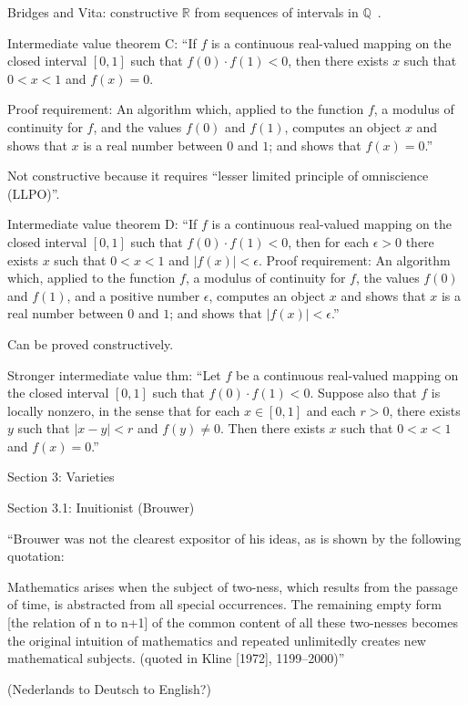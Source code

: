 Bridges and Vita: constructive $\mathbb{R}$ from sequences
of intervals in $\mathbb{Q}$~\cite{Bridger:2019}.

Intermediate value theorem C: 
``If $f$ is a continuous real-valued mapping 
on the closed interval $[0,1]$ such that $f(0)⋅f(1)<0$, 
then there exists $x$ such that $0<x<1$ and $f(x)=0$.

Proof requirement: 
An algorithm which, applied to the function $f$, 
a modulus of continuity for $f$, and the values $f(0)$ and $f(1)$,
computes an object $x$ and shows that $x$ is a real number 
between $0$ and $1$; and
shows that $f(x)=0$.''~\cite{sep:mathematics_constructive}

Not constructive because it requires
``lesser limited principle of omniscience (LLPO)''.

Intermediate value theorem D:
``If $f$ is a continuous real-valued mapping 
on the closed interval $[0,1]$ 
such that $f(0)⋅f(1)<0$, 
then for each $\epsilon>0$ 
there exists $x$ such that $0<x<1$ and $|f(x)|<\epsilon$.
Proof requirement: 
An algorithm which, applied to the function $f$, 
a modulus of continuity for $f$, the values $f(0)$ and $f(1)$, 
and a positive number $\epsilon$,
computes an object $x$ 
and shows that $x$ is a real number between $0$ and $1$; and
shows that $|f(x)|<\epsilon$.''~\cite{sep:mathematics_constructive}

Can be proved constructively.

Stronger intermediate value thm:
``Let $f$ be a continuous real-valued mapping 
on the closed interval $[0,1]$ 
such that $f(0)⋅f(1)<0$. 
Suppose also that $f$ is locally nonzero, 
in the sense that for each $x \in [0,1]$
and each $r>0$, 
there exists $y$ such that $|x−y|<r$ and $f(y) \neq 0$. 
Then there exists $x$ such that $0<x<1$ and $f(x)=0$.''

Section 3: Varieties

Section 3.1: Inuitionist (Brouwer)

``Brouwer was not the clearest expositor of his ideas, 
as is shown by the following quotation:

Mathematics arises when the subject of two-ness, 
which results from the passage of time, 
is abstracted from all special occurrences. 
The remaining empty form [the relation of n to n+1] 
of the common content of all these two-nesses 
becomes the original intuition of mathematics 
and repeated unlimitedly creates new mathematical subjects. 
(quoted in Kline [1972], 1199–2000)''

(Nederlands to Deutsch to English?)

